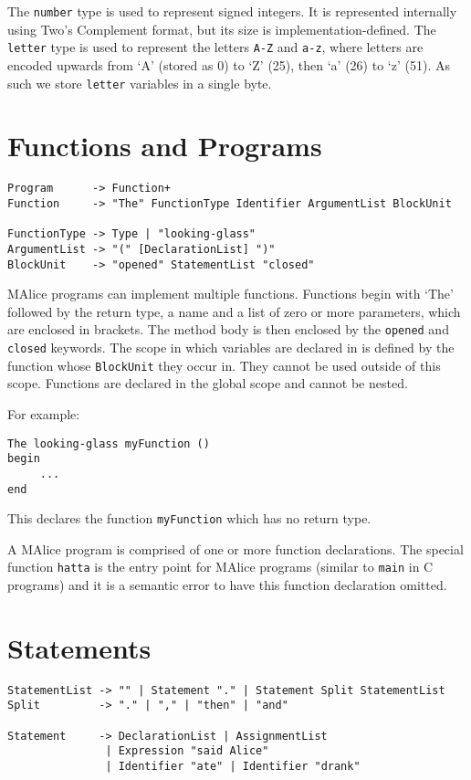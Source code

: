 \documentclass[a4wide, 11pt]{article}
\begin{document}
The \texttt{number} type is used to represent signed integers. It is represented internally using Two's Complement format, but its size is implementation-defined. The \texttt{letter} type is used to represent the letters \texttt{A-Z} and \texttt{a-z}, where letters are encoded upwards from `A' (stored as 0) to `Z' (25), then `a' (26) to `z' (51). As such we store \texttt{letter} variables in a single byte.

\section{Functions and Programs}

\begin{verbatim}
Program      -> Function+
Function     -> "The" FunctionType Identifier ArgumentList BlockUnit

FunctionType -> Type | "looking-glass"
ArgumentList -> "(" [DeclarationList] ")"
BlockUnit    -> "opened" StatementList "closed"
\end{verbatim}

MAlice programs can implement multiple functions. Functions begin with `The' followed by the return type, a name and a list of zero or more parameters, which are enclosed in brackets. The method body is then enclosed by the \texttt{opened} and \texttt{closed} keywords. The scope in which variables are declared in is defined by the function whose \texttt{BlockUnit} they occur in. They cannot be used outside of this scope. Functions are declared in the global scope and cannot be nested. 

For example:

\begin{verbatim}
The looking-glass myFunction ()
begin
     ...
end
\end{verbatim}

This declares the function \texttt{myFunction} which has no return type.


A MAlice program is comprised of one or more function declarations. The special function \texttt{hatta} is the entry point for MAlice programs (similar to \texttt{main} in C programs) and it is a semantic error to have this function declaration omitted.

\section{Statements}

\begin{verbatim}
StatementList -> "" | Statement "." | Statement Split StatementList
Split         -> "." | "," | "then" | "and"
               
Statement     -> DeclarationList | AssignmentList
               | Expression "said Alice"
               | Identifier "ate" | Identifier "drank"
\end{verbatim}
\end{document}
